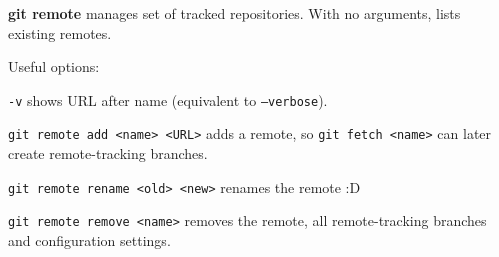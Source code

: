 %

\textbf{git remote} manages set of tracked repositories.
With no arguments, lists existing remotes.

Useful options:
\begin{compactenum}
\item [\texttt{-v}] shows URL after name (equivalent to \texttt{--verbose}).
\end{compactenum}

\texttt{git remote add <name> <URL>} adds a remote, so \texttt{git fetch <name>} can later create remote-tracking branches.

\texttt{git remote rename <old> <new>} renames the remote :D

\texttt{git remote remove <name>} removes the remote, all remote-tracking branches and configuration settings.

%